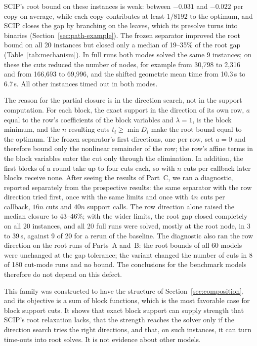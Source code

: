 SCIP's root bound on these instances is weak: between $-0.031$ and $-0.022$ per copy on average, while
each copy contributes at least $1/8192$ to the optimum, and SCIP closes the
gap by branching on the leaves, which its presolve turns into binaries
(Section~\ref{sec:path-example}). The frozen separator improved the root
bound on all 20 instances but closed only a median of 19--35\% of the root
gap (Table~\ref{tab:mechanism}). In full runs both modes solved the same 9
instances; on these the cuts reduced the number of nodes, for example from
30{,}798 to 2{,}316 and from 166{,}693 to 69{,}996, and the shifted geometric
mean time from 10.3\,s to 6.7\,s. All other instances timed out in both
modes.

The reason for the partial closure is in the direction search, not in the
support computation. For each block, the exact support in the direction of
its own row, $a$ equal to the row's coefficients of the block variables and
$\lambda=1$, is the block minimum, and the $n$ resulting cuts
$t_i\ge\min D_i$ make the root bound equal to the optimum. The frozen
separator's first directions, one per row, set $a=0$ and therefore bound
only the nonlinear remainder of the row; the row's affine terms in the block
variables enter the cut only through the elimination. In addition, the
first blocks of a round take up to four cuts each, so with $n$ cuts per
callback later blocks receive none. After seeing the results of Part~C, we
ran a diagnostic, reported separately from the prospective results: the
same separator with the row direction tried first, once with the same
limits and once with $4n$ cuts per callback, $16n$ cuts and $40n$ support
calls. The row direction alone raised the median closure to 43--46\%; with
the wider limits, the root gap closed completely on all 20 instances, and
all 20 full runs were solved, mostly at the root node, in 3 to 39\,s, against
9 of 20 for a rerun of the baseline. The diagnostic also ran the row
direction on the root runs of Parts~A and~B: the root bounds of all 60 models were unchanged at the gap tolerance;
the variant changed the number of cuts in 8 of 180 cut-mode runs and no
bound. The conclusions for the benchmark models therefore do not depend on
this defect.

This family was constructed to have the structure of
Section~\ref{sec:composition}, and its objective is a sum of block
functions, which is the most favorable case for block support cuts. It
shows that exact block support can supply strength that SCIP's root
relaxation lacks, that the strength reaches the solver only if the
direction search tries the right directions, and that, on such instances,
it can turn time-outs into root solves. It is not evidence about other
models.

